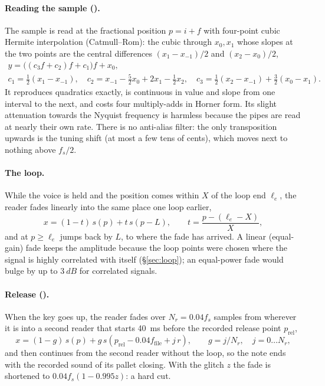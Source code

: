 \paragraph{Reading the sample ().} The sample is read at the fractional position $p = i + f$ with
four-point cubic Hermite interpolation (Catmull--Rom): the cubic through $x_0, x_1$ whose slopes at the two points
are the central differences $(x_1-x_{-1})/2$ and $(x_2-x_0)/2$,
\begin{gather}
  y = \bigl((c_3 f + c_2) f + c_1\bigr) f + x_0,\\
  c_1 = \tfrac12(x_1 - x_{-1}),\quad c_2 = x_{-1} - \tfrac52 x_0 + 2x_1 - \tfrac12 x_2,\quad
  c_3 = \tfrac12(x_2 - x_{-1}) + \tfrac32(x_0 - x_1).
\end{gather}
It reproduces quadratics exactly, is continuous in value and slope from one interval to the next, and costs four
multiply-adds in Horner form. Its slight attenuation towards the Nyquist frequency is harmless because the pipes are
read at nearly their own rate. There is no anti-alias filter: the only transposition upwards is the tuning shift
(at most a few tens of cents), which moves next to nothing above $f_s/2$.

\paragraph{The loop.} While the voice is held and the position comes within $X$ of the loop end $\ell_e$, the
reader fades linearly into the same place one loop earlier,
\begin{equation}
  x = (1-t)\,s(p) + t\,s(p-L),\qquad t = \frac{p - (\ell_e - X)}{X},
\end{equation}
and at $p\ge\ell_e$ jumps back by $L$, to where the fade has arrived. A linear (equal-gain) fade keeps the amplitude
because the loop points were chosen where the signal is highly correlated with itself (\S\ref{sec:loop}); an
equal-power fade would bulge by up to $\SI{3}{dB}$ for correlated signals.

\paragraph{Release ().} When the key goes up, the reader fades over $N_r = 0.04f_s$ samples
from wherever it is into a second reader that starts \SI{40}{ms} before the recorded release point $p_\mathrm{rel}$,
\begin{equation}
  x = (1-g)\,s(p) + g\,s(p_\mathrm{rel}-0.04 f_\mathrm{file} + j\,r),\qquad g = j/N_r,\quad j = 0\dots N_r,
\end{equation}
and then continues from the second reader without the loop, so the note ends with the recorded sound of its pallet
closing. With the glitch  $z$ the fade is shortened to $0.04f_s(1-0.995z)$: a hard cut.

